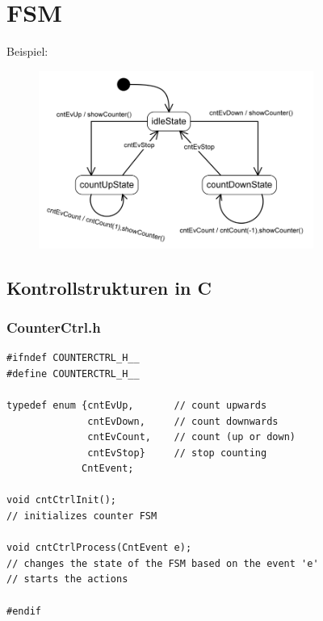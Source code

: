 \section{FSM}

Beispiel:
\begin{figure}[htbp]
	\centering
	\includegraphics[width=9cm]{images/FSM.png}
\end{figure}

\subsection{Kontrollstrukturen in C }
\subsubsection{CounterCtrl.h}
\begin{lstlisting}[style=Csharp]
#ifndef COUNTERCTRL_H__
#define COUNTERCTRL_H__

typedef enum {cntEvUp,       // count upwards
              cntEvDown,     // count downwards
              cntEvCount,    // count (up or down)
              cntEvStop}     // stop counting
             CntEvent;

void cntCtrlInit();
// initializes counter FSM

void cntCtrlProcess(CntEvent e);
// changes the state of the FSM based on the event 'e'
// starts the actions

#endif
\end{lstlisting}

